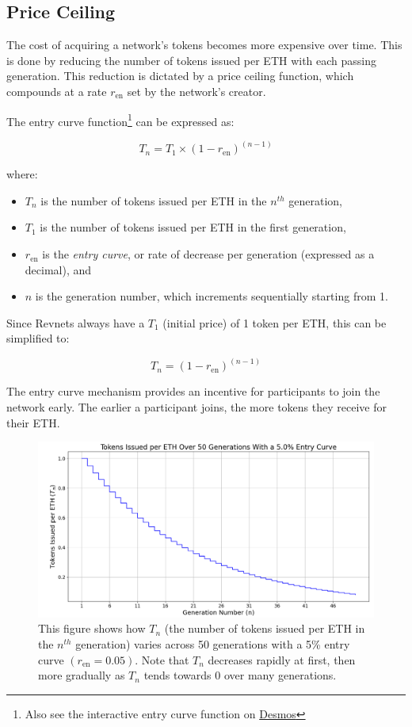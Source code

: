 \documentclass{article}
\begin{document}
\subsection{Price Ceiling}

The cost of acquiring a network's tokens becomes more expensive over time. This is done by reducing the number of tokens issued per ETH with each passing generation. This reduction is dictated by a price ceiling function, which compounds at a rate $r_\text{en}$ set by the network's creator.

The entry curve function\footnote{Also see the interactive entry curve function on \href{https://www.desmos.com/calculator/ey9fhuslwe}{Desmos}} can be expressed as:

\begin{equation}
  T_n = T_1 \times (1 - r_{\text{en}})^{(n - 1)}
\end{equation}

where:
\begin{itemize}
  \item $T_n$ is the number of tokens issued per ETH in the $n^{th}$ generation,
  \item $T_1$ is the number of tokens issued per ETH in the first generation,
  \item $r_{\text{en}}$ is the \textit{entry curve}, or rate of decrease per generation (expressed as a decimal), and
  \item $n$ is the generation number, which increments sequentially starting from 1.
\end{itemize}

Since Revnets always have a $T_1$ (initial price) of 1 token per ETH, this can be simplified to:

\begin{equation}
  T_n = (1 - r_{\text{en}})^{(n - 1)}
\end{equation}

The entry curve mechanism provides an incentive for participants to join the network early. The earlier a participant joins, the more tokens they receive for their ETH.

\begin{figure}[h]
  \centering
  \includegraphics[width=\textwidth]{figures/single-entry-curve.png}
   \caption{This figure shows how $T_n$ (the number of tokens issued per ETH in the $n^{th}$ generation) varies across 50 generations with a 5\% entry curve $(r_{\text{en}} = 0.05)$. Note that $T_n$ decreases rapidly at first, then more gradually as $T_n$ tends towards 0 over many generations.}
\end{figure}
\end{document}
